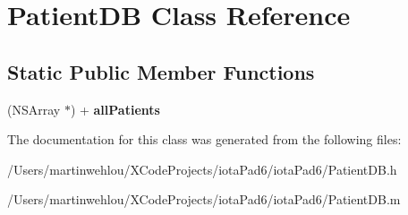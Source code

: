 \hypertarget{interface_patient_d_b}{
\section{PatientDB Class Reference}
\label{interface_patient_d_b}
}
\subsection*{Static Public Member Functions}
\begin{DoxyCompactItemize}
\item 
\hypertarget{interface_patient_d_b_a402b3d24a53b3033da4beb5b10002027}{
(NSArray $\ast$) + {\bfseries allPatients}}
\label{interface_patient_d_b_a402b3d24a53b3033da4beb5b10002027}

\end{DoxyCompactItemize}


The documentation for this class was generated from the following files:\begin{DoxyCompactItemize}
\item 
/Users/martinwehlou/XCodeProjects/iotaPad6/iotaPad6/PatientDB.h\item 
/Users/martinwehlou/XCodeProjects/iotaPad6/iotaPad6/PatientDB.m\end{DoxyCompactItemize}
